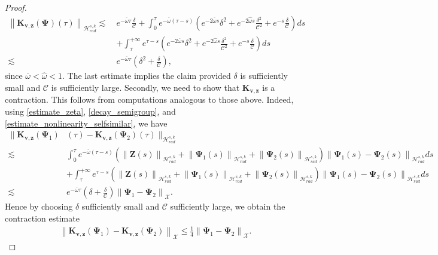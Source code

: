 \documentclass[12pt,reqno]{amsart}
\theoremstyle{plain}
\theoremstyle{remark}
\theoremstyle{plain}
\theoremstyle{definition}
\numberwithin{equation}{section}
\numberwithin{equation}{section}
\newcommand{\norm}[1]{\left\|#1\right\|}
\newcommand{\HH}{\mathcal{H}}
\begin{document}
\begin{proof}
\begin{align*}
			\norm{\mathbf{K}_{\mathbf{v},\mathbf{z}}(\mathbf{\Psi})(\tau)}_{\HH_{rad}^{s,k}}\lesssim \ & e^{-\overline{\omega} \tau}\frac{\delta}{\mathcal{C}}+\int_0^\tau e^{-\overline{\omega}(\tau-s)} \left(e^{-2\overline{\omega} s}\delta^2+e^{-2\hat{\omega} s}\frac{\delta^2}{\mathcal{C}^2}+e^{- s}\frac{\delta}{\mathcal{C}}\right)ds\\ & +\int_{\tau}^{+\infty} e^{\tau-s}\left(e^{-2\overline{\omega} s}\delta^2+e^{-2\hat{\omega} s}\frac{\delta^2}{\mathcal{C}^2}+e^{- s}\frac{\delta}{\mathcal{C}}\right)ds\\  \lesssim \ & e^{-\overline{\omega} \tau}\left(\delta^2+\frac{\delta}{\mathcal{C}}\right),
		\end{align*}
		since $\overline{\omega}<\hat{\omega}<1$.
		The last estimate implies the claim provided $\delta$ is sufficiently small and $\mathcal{C}$ is sufficiently large. Secondly, we need to show that $\mathbf{K}_{\mathbf{v},\mathbf{z}}$ is a contraction. This follows from computations analogous to those above. Indeed, using \eqref{estimate_zeta}, \eqref{decay_semigroup}, and \eqref{estimate_nonlinearity_selfsimilar}, we have
		\begin{align*}
			\| \mathbf{K}_{\mathbf{v},\mathbf{z}}(\mathbf{\Psi}_1)&(\tau)-\mathbf{K}_{\mathbf{v},\mathbf{z}}(\mathbf{\Psi}_2)(\tau)\|_{\HH_{rad}^{s,k}}\\  \lesssim \ & \int_0^{\tau} e^{-\overline{\omega}(\tau-s)}\left(\norm{\mathbf{Z}(s)}_{\HH_{rad}^{s,k}}+\norm{\mathbf{\Psi}_1(s)}_{\HH_{rad}^{s,k}}+\norm{\mathbf{\Psi}_2(s)}_{\HH_{rad}^{s,k}}\right)\norm{\mathbf{\Psi}_1(s)-\mathbf{\Psi}_2(s)}_{\HH_{rad}^{s,k}}ds\\ & +\int_{\tau}^{+\infty} e^{\tau-s} \left(\norm{\mathbf{Z}(s)}_{\HH_{rad}^{s,k}}+\norm{\mathbf{\Psi}_1(s)}_{\HH_{rad}^{s,k}}+\norm{\mathbf{\Psi}_2(s)}_{\HH_{rad}^{s,k}}\right)\norm{\mathbf{\Psi}_1(s)-\mathbf{\Psi}_2(s)}_{\HH_{rad}^{s,k}} ds\\  \lesssim \ &e^{-\overline{\omega} \tau}(\delta+\frac{\delta}{\mathcal{C}})\norm{\mathbf{\Psi}_1-\mathbf{\Psi}_2}_{\mathcal{X}}.
		\end{align*}
		Hence by choosing $\delta$ sufficiently small and $\mathcal{C}$ sufficiently large, we obtain the contraction estimate
		\begin{align}\label{contraction_estimate}
			\norm{\mathbf{K}_{\mathbf{v},\mathbf{z}}(\mathbf{\Psi}_1)-\mathbf{K}_{\mathbf{v},\mathbf{z}}(\mathbf{\Psi}_2)}_{\mathcal{X}}\leq \frac{1}{4}   \norm{\mathbf{\Psi}_1-\mathbf{\Psi}_2}_{\mathcal{X}}.
		\end{align}

\end{proof}
\end{document}
